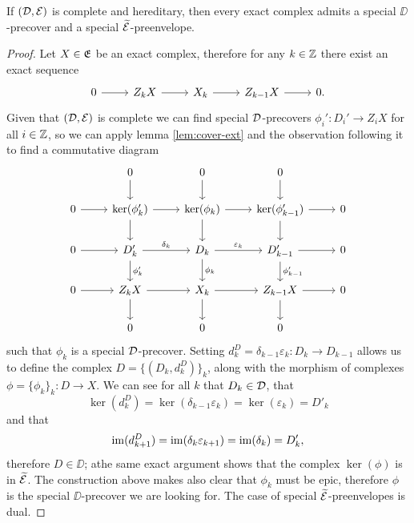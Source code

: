 \begin{lemma}
    \label{lem:find-precover}
    If $(\mathcal{D}, \mathcal{E})$ is complete and hereditary, then every exact complex admits a special $\DD$-precover and a special $\widetilde{\mathcal{E}}$-preenvelope.
\end{lemma}

\begin{proof}
    Let $X\in \mathfrak{E}$ be an exact complex, therefore for any $k \in \mathbb{Z}$ there exist an exact sequence 
    \[\begin{tikzcd}
        0 & {Z_{k}X} & {X_k} & {Z_{k-1}X} & {0.}
        \arrow[from=1-1, to=1-2]
        \arrow[from=1-2, to=1-3]
        \arrow[from=1-3, to=1-4]
        \arrow[from=1-4, to=1-5]
    \end{tikzcd}\]
    Given that $(\mathcal{D}, \mathcal{E})$ is complete we can find special $\mathcal{D}$-precovers $\phi_i' \colon D_i'  \longrightarrow Z_i X$ for all $i\in \mathbb{Z}$, so we can apply lemma \ref{lem:cover-ext} and the  observation following it to find a commutative diagram 
    \[\begin{tikzcd}
        & 0 & 0 & 0 & \\
        0 & {\ker(\phi_k')} & {\ker(\phi_k)} & {\ker(\phi_{k-1}')} & 0 \\
        0 & {D_k'} & {D_k} & {D_{k-1}'} & 0 \\
        0 & {Z_{k}X} & {X_k} & {Z_{k-1}X} & 0 \\
        & 0 & 0 & 0
        \arrow[from=1-2, to=2-2]
        \arrow[from=1-3, to=2-3]
        \arrow[from=1-4, to=2-4]
        \arrow[from=2-1, to=2-2]
        \arrow[from=2-2, to=2-3]
        \arrow[from=2-2, to=3-2]
        \arrow[from=2-3, to=2-4]
        \arrow[from=2-3, to=3-3]
        \arrow[from=2-4, to=2-5]
        \arrow[from=2-4, to=3-4]
        \arrow[from=3-1, to=3-2]
        \arrow["{\delta_k}", from=3-2, to=3-3]
        \arrow["{\phi_k'}", from=3-2, to=4-2]
        \arrow["{\varepsilon_k}", from=3-3, to=3-4]
        \arrow["{\phi_k}", from=3-3, to=4-3]
        \arrow[from=3-4, to=3-5]
        \arrow["{\phi_{k-1}'}", from=3-4, to=4-4]
        \arrow[from=4-1, to=4-2]
        \arrow[from=4-2, to=4-3]
        \arrow[from=4-2, to=5-2]
        \arrow[from=4-3, to=4-4]
        \arrow[from=4-3, to=5-3]
        \arrow[from=4-4, to=4-5]
        \arrow[from=4-4, to=5-4]
    \end{tikzcd}\]
    such that $\phi_k$ is a special $\mathcal{D}$-precover. Setting $d^D_k= \delta_{k-1}\varepsilon_k \colon D_k \longrightarrow D_{k-1}$ allows us to define the complex $D= \{ (D_k, d^D_k)\}_k$, along with the morphism of complexes $\phi=\{\phi_k\}_k \colon D \longrightarrow X$. We can see for all $k$ that $D_k \in \mathcal{D}$, that \[\ker(d^D_k) = \ker(\delta_{k-1}\varepsilon_k) = \ker(\varepsilon_k) = D'_k\] and that \[\operatorname{im}(d^D_{k+1}) = \operatorname{im}(\delta_{k}\varepsilon_{k+1}) = \operatorname{im}(\delta_{k}) = D'_k,\] therefore $D \in \DD$; athe same exact argument shows that the complex $\ker(\phi)$ is in $\widetilde{\mathcal{E}}$.
    The construction above makes also clear that $\phi_k$ must be epic, therefore $\phi$ is the special $\DD$-precover we are looking for. The case of special $\widetilde{\mathcal{E}}$-preenvelopes is dual.

\end{proof}


